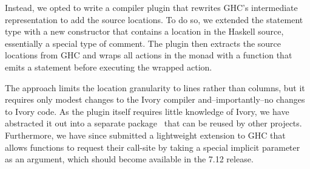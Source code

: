 Instead, we opted to write a compiler plugin that rewrites GHC's intermediate
representation to add the source locations. To do so, we extended the  statement type with a new
 constructor that contains a location in the Haskell source,
essentially a special type of comment. The plugin then extracts the source
locations from GHC and wraps all actions in the  monad with a
 function that emits a  statement before executing
the wrapped action.

The approach limits the location granularity to
lines rather than columns, but it requires only modest changes to the
Ivory compiler and--importantly--no changes to Ivory code. As the plugin
itself requires little knowledge of Ivory, we have abstracted it out into a
separate package~\cite{ghc-srcspan-plugin} that can be reused by other projects.
Furthermore, we have since submitted a lightweight extension to GHC that allows
functions to request their call-site by taking a special implicit
parameter~\cite{lewis2000implicit} as an argument, which should become available
in the 7.12 release.
